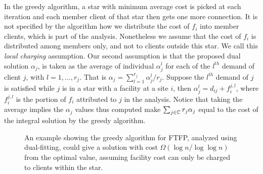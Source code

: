 \documentclass[oneside,final]{ucr}
\begin{document}
In the greedy algorithm, a star with minimum average cost is
picked at each iteration and each member client of that star
then gets one more connection. It is not specified by the
algorithm how we distribute the cost of $f_i$ into member
clients, which is part of the analysis. Nonetheless we
assume that the cost of $f_i$ is distributed among members
only, and not to clients outside this star. We call this
\emph{local charging} assumption. Our second assumption is
that the proposed dual solution $\alpha_j$, is taken as the
average of individual $\alpha_j^l$ for each of the $l^{th}$
demand of client $j$, with $l=1,\ldots,r_j$. That is
$\alpha_j = \sum_{l=1}^{r_j} \alpha_j^l / r_j$. Suppose the
$l^{th}$ demand of $j$ is satisfied while $j$ is in a star
with a facility at a site $i$, then $\alpha_j^l = d_{ij} +
f_i^{j,l}$, where $f_i^{j,l}$ is the portion of $f_i$
attributed to $j$ in the analysis. Notice that taking the
average implies the $\alpha_j$ values thus computed make
$\sum_{j\in\mathbb{C}} r_j \alpha_j$ equal to the cost of
the integral solution by the greedy algorithm.

\begin{figure}
  \centering
  \caption[$\Omega(\log n / \log\log n)$ example for
  dual-fitting on {\FTFP}]{An example showing the greedy
    algorithm for FTFP, analyzed using dual-fitting, could
    give a solution with cost $\Omega(\log n / \log\log n)$
    from the optimal value, assuming facility cost can only
    be charged to clients within the star.}
  \label{fig:greedy_lower_bound}
\end{figure}
\end{document}
